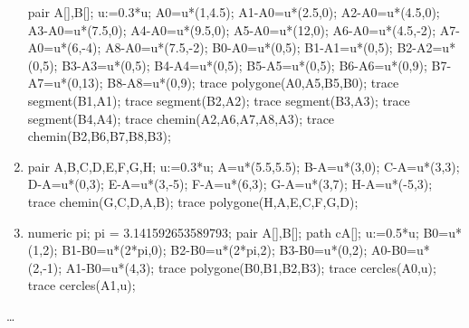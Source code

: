 \begin{exercice*}
\begin{minipage}{0.45\linewidth}
\begin{enumerate}
            \begin{Geometrie}
                pair A[],B[];
                u:=0.3*u;
                A0=u*(1,4.5);
                A1-A0=u*(2.5,0);
                A2-A0=u*(4.5,0);
                A3-A0=u*(7.5,0);
                A4-A0=u*(9.5,0);
                A5-A0=u*(12,0);
                A6-A0=u*(4.5,-2);
                A7-A0=u*(6,-4);
                A8-A0=u*(7.5,-2);
                B0-A0=u*(0,5);
                B1-A1=u*(0,5);
                B2-A2=u*(0,5);
                B3-A3=u*(0,5);
                B4-A4=u*(0,5);
                B5-A5=u*(0,5);
                B6-A6=u*(0,9);
                B7-A7=u*(0,13);
                B8-A8=u*(0,9);
                trace polygone(A0,A5,B5,B0);
                trace segment(B1,A1);
                trace segment(B2,A2);
                trace segment(B3,A3);
                trace segment(B4,A4);
                trace chemin(A2,A6,A7,A8,A3);
                trace chemin(B2,B6,B7,B8,B3);
            \end{Geometrie}
            \item \phantom{rrr}
            
            \begin{Geometrie}
                pair A,B,C,D,E,F,G,H;
                u:=0.3*u;
                A=u*(5.5,5.5);
                B-A=u*(3,0);
                C-A=u*(3,3);
                D-A=u*(0,3);
                E-A=u*(3,-5);
                F-A=u*(6,3);
                G-A=u*(3,7);
                H-A=u*(-5,3);
                trace chemin(G,C,D,A,B);
                trace polygone(H,A,E,C,F,G,D);                
            \end{Geometrie}
            \item \phantom{rrr}
            
            \begin{Geometrie}
                numeric pi;
                pi = 3.141592653589793;
                pair A[],B[];
                path cA[];
                u:=0.5*u;
                B0=u*(1,2);
                B1-B0=u*(2*pi,0);
                B2-B0=u*(2*pi,2);
                B3-B0=u*(0,2);
                A0-B0=u*(2,-1);
                A1-B0=u*(4,3);
                trace polygone(B0,B1,B2,B3);
                trace cercles(A0,u);
                trace cercles(A1,u);
            \end{Geometrie}
        \end{enumerate}
    \end{minipage}
\end{exercice*}
\begin{corrige}
    \dots
\end{corrige}

